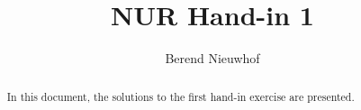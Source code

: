 \documentclass[a4paper,10pt]{article}
\title{NUR Hand-in 1}
\author{Berend Nieuwhof}
\begin{document}
\maketitle

\begin{abstract}
    In this document, the solutions to the first hand-in exercise are presented. 
\end{abstract}




\end{document}
